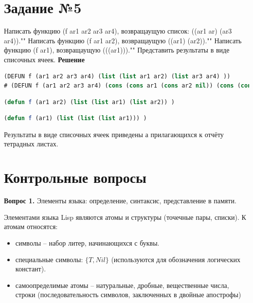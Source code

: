 \documentclass[12pt]{report}
\begin{document}
\section*{Задание №5}

\indent Написать функцию (f ar1 ar2 ar3 ar4), возвращаущую список: ((ar1 ar) (ar3 ar4)).""\newline
\indent Написать функцию (f ar1 ar2), возвращаущую ((ar1) (ar2)).""\newline
\indent Написать функцию (f ar1), возвращаущую (((ar1))).""\newline
\indent Представить результаты в виде списочных ячеек. 
\textbf{Решение}
\begin{lstlisting}[label=third,caption=Решение задания №5 (функция №1), language=lisp]
(DEFUN f (ar1 ar2 ar3 ar4) (list (list ar1 ar2) (list ar3 ar4) ))
# (DEFUN f (ar1 ar2 ar3 ar4) (cons (cons ar1 (cons ar2 nil)) (cons (cons ar3 (cons ar4 nil)) nil) ))
\end{lstlisting}

\begin{lstlisting}[label=third,caption=Решение задания №5 (функция №2), language=lisp]
(defun f (ar1 ar2) (list (list ar1) (list ar2)) )
\end{lstlisting}

\begin{lstlisting}[label=third,caption=Решение задания №5 (функция №3), language=lisp]
(defun f (ar1) (list (list (list ar1))) )
\end{lstlisting}
Результаты в виде списочных ячеек приведены а прилагающихся к отчёту тетрадных листах.
\section*{Контрольные вопросы}
	\textbf{Вопрос 1.} Элементы языка: определение, синтаксис, представление в памяти.
	
	Элементами языка Lisp являются атомы и структуры (точечные пары, списки). К атомам относятся:
	\begin{itemize}
		\item символы -- набор литер, начинающихся с буквы.
		\item специальные символы: $\{T, Nil\}$ (используются для обозначения логических констант).
		\item самоопределимые атомы -- натуральные, дробные, вещественные числа, строки (последовательность символов, заключенных в двойные апострофы)
	\end{itemize}
	
\end{document}
